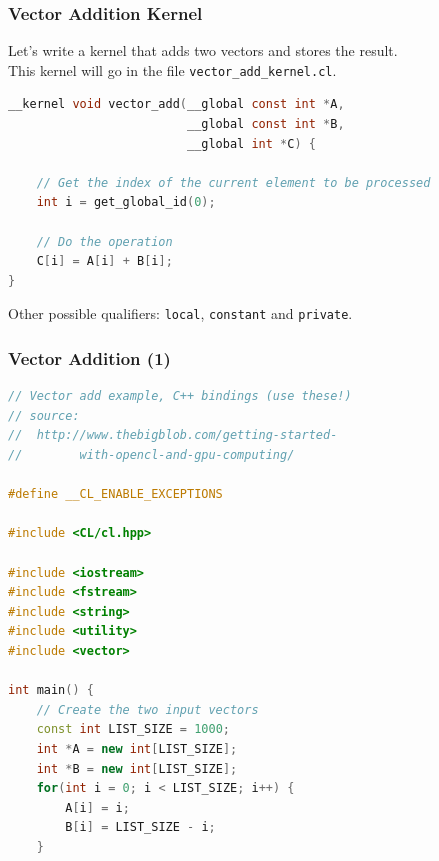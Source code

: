 \begin{frame}[fragile]
  \frametitle{Vector Addition Kernel}


    Let's write a kernel that adds two vectors and stores the result.\\
    This kernel will go in the file {\tt vector\_add\_kernel.cl}.

  \begin{lstlisting}[language=C]
__kernel void vector_add(__global const int *A,
                         __global const int *B,
                         __global int *C) {
 
    // Get the index of the current element to be processed
    int i = get_global_id(0);
 
    // Do the operation
    C[i] = A[i] + B[i];
}
  \end{lstlisting}

    Other possible qualifiers: {\tt local}, {\tt constant} and {\tt private}.


\end{frame}

\begin{frame}[fragile]
  \frametitle{Vector Addition (1)}


  \begin{lstlisting}[language=C++]
// Vector add example, C++ bindings (use these!)
// source:
//  http://www.thebigblob.com/getting-started-
//        with-opencl-and-gpu-computing/

#define __CL_ENABLE_EXCEPTIONS

#include <CL/cl.hpp>

#include <iostream>
#include <fstream>
#include <string>
#include <utility>
#include <vector>
 
int main() {
    // Create the two input vectors
    const int LIST_SIZE = 1000;
    int *A = new int[LIST_SIZE]; 
    int *B = new int[LIST_SIZE];
    for(int i = 0; i < LIST_SIZE; i++) {
        A[i] = i;
        B[i] = LIST_SIZE - i;
    }
  \end{lstlisting}

\end{frame}

